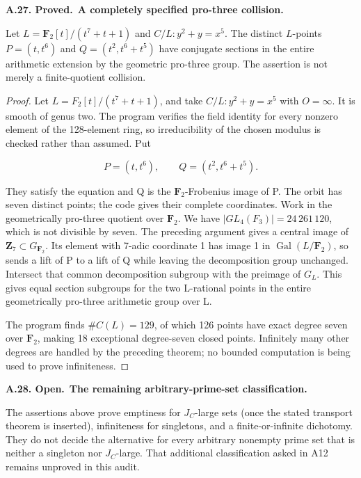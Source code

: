 \documentclass[11pt,a4paper]{article}
\newenvironment{claim}[3]{\par\medskip\noindent\hypertarget{#1}{\textbf{#1. #2.}}\ \textbf{#3.}\par\nopagebreak\smallskip\begingroup\itshape}{\endgroup\par\smallskip}
\begin{document}
\begin{claim}{A.27}{Proved}{A completely specified pro-three collision}

Let $L=\mathbf F_2[t]/(t^7+t+1)$ and $C/L:y^2+y=x^5$.
The distinct $L$-points
$P=(t,t^6)$ and $Q=(t^2,t^6+t^5)$ have conjugate sections in
the entire arithmetic extension by the geometric pro-three group.
The assertion is not merely a finite-quotient collision.

\end{claim}

\begin{proof}

Let \(L=F_2[t]/(t^7+t+1)\), and take \(C/L:y^2+y=x^5\) with \(O={\infty}\). It is smooth of genus two. The program verifies the field identity for every nonzero element of the 128-element ring, so irreducibility of the chosen modulus is checked rather than assumed. Put

\[P=(t,t^6),\qquad Q=(t^2,t^6+t^5).\]

They satisfy the equation and Q is the \(\mathbf{F}_2\)-Frobenius image of P. The orbit has seven distinct points; the code gives their complete coordinates. Work in the geometrically pro-three quotient over \(\mathbf{F}_2\). We have \(|GL_4(F_3)|=24\,261\,120\), which is not divisible by seven. The preceding argument gives a central image of \(\mathbf{Z}_7{\subset}G_{\mathbf{F}_2}\). Its element with 7-adic coordinate 1 has image 1 in \(\operatorname{Gal}(L/\mathbf{F}_2)\), so sends a lift of P to a lift of Q while leaving the decomposition group unchanged. Intersect that common decomposition subgroup with the preimage of \(G_L\). This gives equal section subgroups for the two L-rational points in the entire geometrically pro-three arithmetic group over L.

The program finds \(\#C(L)=129\), of which 126 points have exact degree seven over \(\mathbf{F}_2\), making 18 exceptional degree-seven closed points. Infinitely many other degrees are handled by the preceding theorem; no bounded computation is being used to prove infiniteness.


\end{proof}

\begin{claim}{A.28}{Open}{The remaining arbitrary-prime-set classification}

The assertions above prove emptiness for $J_C$-large sets (once
the stated transport theorem is inserted), infiniteness for
singletons, and a finite-or-infinite dichotomy. They do not decide
the alternative for every arbitrary nonempty prime set that is
neither a singleton nor $J_C$-large. That additional classification
asked in A12 remains unproved in this audit.

\end{claim}
\end{document}
